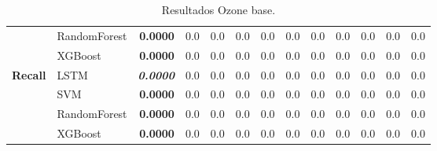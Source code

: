 \begin{table}[H]
\begin{adjustbox}{max width=14cm}
\begin{tabular}{|c|l|r|r|r|r|r|r|r|r|r|r|r|}
			&  RandomForest & \textbf{  0.0000 } &  0.0 &  0.0 &  0.0 &  0.0 &  0.0 &  0.0 &  0.0 &  0.0 &  0.0 &  0.0 \\
			&  XGBoost & \textbf{  0.0000 } &  0.0 &  0.0 &  0.0 &  0.0 &  0.0 &  0.0 &  0.0 &  0.0 &  0.0 &  0.0 \\
			\hline
			\textbf{Recall} &  LSTM & \textit{ \textbf{  0.0000 } } &  0.0 &  0.0 &  0.0 &  0.0 &  0.0 &  0.0 &  0.0 &  0.0 &  0.0 &  0.0 \\
			&  SVM & \textbf{  0.0000 } &  0.0 &  0.0 &  0.0 &  0.0 &  0.0 &  0.0 &  0.0 &  0.0 &  0.0 &  0.0 \\
			&  RandomForest & \textbf{  0.0000 } &  0.0 &  0.0 &  0.0 &  0.0 &  0.0 &  0.0 &  0.0 &  0.0 &  0.0 &  0.0 \\
			&  XGBoost & \textbf{  0.0000 } &  0.0 &  0.0 &  0.0 &  0.0 &  0.0 &  0.0 &  0.0 &  0.0 &  0.0 &  0.0 \\
			\hline
		\end{tabular}
	\end{adjustbox}
	\caption{Resultados Ozone base.}
	\label{tab:Ozone_base}
\end{table}

